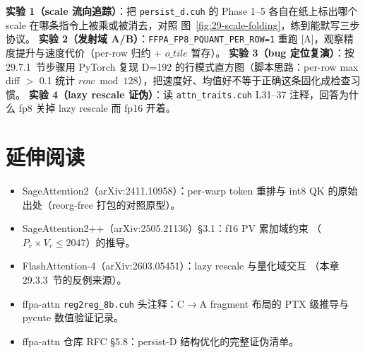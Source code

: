 \textbf{实验 1（scale 流向追踪）}：把 \texttt{persist\_d.cuh} 的
Phase 1--5 各自在纸上标出哪个 scale 在哪条指令上被乘或被消去，对照
图~\ref{fig:29-scale-folding}，练到能默写三步协议。
\textbf{实验 2（发射域 A/B）}：\texttt{FFPA\_FP8\_PQUANT\_PER\_ROW=1}
重跑 [A]，观察精度提升与速度代价（per-row 归约 + $o\_tile$ 暂存）。
\textbf{实验 3（bug 定位复演）}：按 29.7.1~节步骤用 PyTorch 复现 D=192
的行模式直方图（脚本思路：per-row max diff $>$ 0.1 统计
$row\bmod128$），把速度好、均值好不等于正确这条固化成检查习惯。
\textbf{实验 4（lazy rescale 证伪）}：读 \texttt{attn\_traits.cuh}
L31--37 注释，回答为什么 fp8 关掉 lazy rescale 而 fp16 开着。

\section*{延伸阅读}
\begin{itemize}[itemsep=0pt,topsep=2pt]
  \item SageAttention2（arXiv:2411.10958）：per-warp token 重排与 int8 QK
        的原始出处（reorg-free 打包的对照原型）。
  \item SageAttention2++（arXiv:2505.21136）\S3.1：f16 PV 累加域约束
        （$P_r\times V_r\le2047$）的推导。
  \item FlashAttention-4（arXiv:2603.05451）：lazy rescale 与量化域交互
        （本章 29.3.3~节的反例来源）。
  \item ffpa-attn \texttt{reg2reg\_8b.cuh} 头注释：C$\to$A fragment
        布局的 PTX 级推导与 pycute 数值验证记录。
  \item ffpa-attn 仓库 RFC \S5.8：persist-D 结构优化的完整证伪清单。
\end{itemize}
